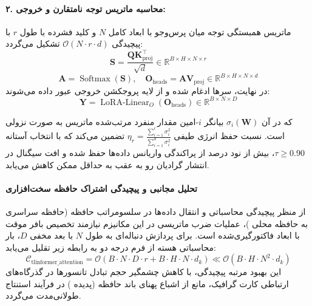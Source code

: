 \paragraph{۲. محاسبه ماتریس توجه نامتقارن و خروجی:}
ماتریس همبستگی توجه میان پرس‌وجو با ابعاد کامل $N$ و کلید فشرده با طول $r$ با پیچیدگی $\mathcal{O}(N \cdot r \cdot d)$ تشکیل می‌گردد:
\begin{equation}
\mathbf{S} = \frac{\mathbf{Q} \mathbf{K}_{\text{proj}}^\top}{\sqrt{d}} \in \mathbb{R}^{B \times H \times N \times r}
\end{equation}
\begin{equation}
\mathbf{A} = \operatorname{Softmax}(\mathbf{S}), \quad \mathbf{O}_{\text{heads}} = \mathbf{A} \mathbf{V}_{\text{proj}} \in \mathbb{R}^{B \times H \times N \times d}
\end{equation}
در نهایت، سرها ادغام شده و از لایه پروجکشن خروجی عبور داده می‌شوند:
\begin{equation}
\mathbf{Y} = \operatorname{LoRA-Linear}_O(\mathbf{O}_{\text{heads}}) \in \mathbb{R}^{B \times N \times D}
\end{equation}

که در آن $\sigma_i(\mathbf{W})$ بیانگر $i$-امین مقدار منفرد مرتب‌شده ماتریس به صورت نزولی است. نسبت حفظ انرژی طیفی $\eta_r = \frac{\sum_{i=1}^r \sigma_i^2}{\sum_{i=1}^{d} \sigma_i^2}$ تضمین می‌کند که با انتخاب آستانه $\tau \ge 0.90$، بیش از نود درصد از پراکندگی واریانس داده‌ها حفظ شده و افت سیگنال در انتشار گرادیان رو به عقب به حداقل ممکن کاهش می‌یابد.

\paragraph{تحلیل مجانبی و پیچیدگی اشتراک حافظه سخت‌افزاری}
از منظر پیچیدگی محاسباتی و انتقال داده‌ها در سلسومراتب حافظه (حافظه سراسری  به حافظه محلی )، عملیات ضرب ماتریسی در این مکانیزم نیازمند تخصیص بافر موقت با ابعاد فاکتورگیری‌شده است. برای پردازش دنباله‌ای به طول $N$ با بعد مخفی $D$، بار محاسباتی هسته از فرم درجه دو به رابطه زیر تقلیل می‌یابد:
\begin{equation}
\label{eq:complexity_tlinformer_attention}
\mathcal{C}_{\text{tlinformer\_attention}} = \mathcal{O}\left( B \cdot N \cdot D \cdot r + B \cdot H \cdot N \cdot d_k \right) \ll \mathcal{O}\left( B \cdot H \cdot N^2 \cdot d_k \right)
\end{equation}
این بهبود مرتبه پیچیدگی، با کاهش چشمگیر حجم تبادل تانسورها در گذرگاه‌های ارتباطی کارت گرافیک، مانع از اشباع پهنای باند حافظه (پدیده ) در فرآیند استنتاج طولانی‌مدت می‌گردد.
